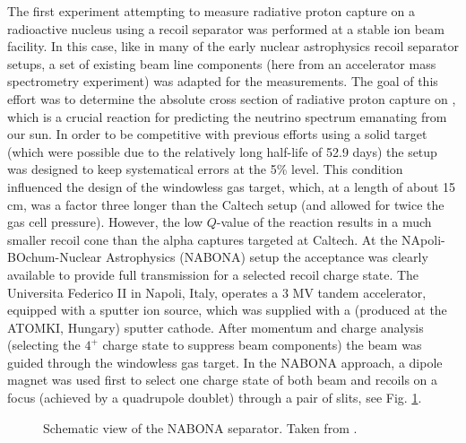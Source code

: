 The first experiment attempting to measure radiative proton capture on a radioactive nucleus using a recoil separator was performed at a stable ion beam facility. In this case, like in many of the early nuclear astrophysics recoil separator setups, a set of existing beam line components (here from an accelerator mass spectrometry experiment) was adapted for the measurements. The goal of this effort was to determine the absolute cross section of radiative proton capture on , which is a crucial reaction for predicting the neutrino spectrum emanating from our sun. In order to be competitive with previous efforts using a solid  target (which were possible due to the relatively long half-life of 52.9 days) the setup was designed to keep systematical errors at the 5\% level. This condition influenced the design of the windowless gas target, which, at a length of about 15 cm, was a factor three longer than the Caltech setup (and allowed for twice the gas cell pressure). However, the low $Q$-value of the  reaction results in a much smaller recoil cone than the alpha captures targeted at Caltech. At the NApoli-BOchum-Nuclear Astrophysics (NABONA) setup the acceptance was clearly available to provide full transmission for a selected recoil charge state. The Universita Federico II in Napoli, Italy, operates a 3 MV tandem accelerator, equipped with a sputter ion source, which was supplied with a  (produced at the ATOMKI, Hungary) sputter cathode. After momentum and charge analysis (selecting the $4^+$ charge state to suppress  beam components) the  beam was guided through the windowless gas target. In the NABONA approach, a dipole magnet was used first to select one charge state of both beam and recoils on a focus (achieved by a quadrupole doublet) through a pair of slits, see Fig. \ref{fig:nabona}.
\begin{figure}
\caption{Schematic view of the NABONA separator. Taken from \cite{gial96}.}
\label{fig:nabona}
\end{figure}
